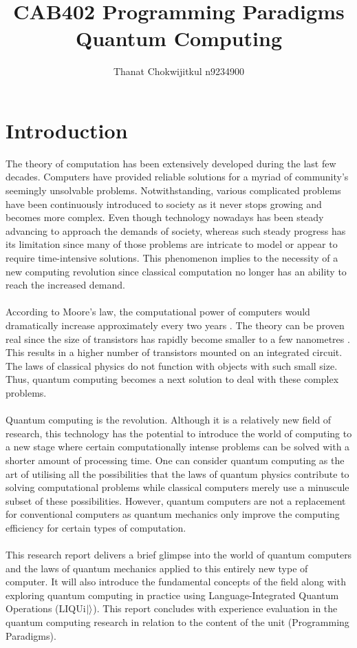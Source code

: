 \documentclass[12pt]{third-rep}
\title{CAB402 Programming Paradigms \\ \vspace{2 mm} {Quantum Computing}}
\author{Thanat Chokwijitkul n9234900}
\date{}
\begin{document}
\maketitle %

\tableofcontents


\chapter{Introduction}

The theory of computation has been extensively developed during the last few decades. Computers have provided reliable solutions for a myriad of community's seemingly unsolvable problems. Notwithstanding, various complicated problems have been continuously introduced to society as it never stops growing and becomes more complex. Even though technology nowadays has been steady advancing to approach the demands of society, whereas such steady progress has its limitation since many of those problems are intricate to model or appear to require time-intensive solutions. This phenomenon implies to the necessity of a new computing revolution since classical computation no longer has an ability to reach the increased demand. \\\\
According to Moore's law, the computational power of computers would dramatically increase approximately every two years \cite{moore}. The theory can be proven real since the size of transistors has rapidly become smaller to a few nanometres \cite{qc-info}. This results in a higher number of transistors mounted on an integrated circuit. The laws of classical physics do not function with objects with such small size. Thus, quantum computing becomes a next solution to deal with these complex problems. \\\\
Quantum computing is the revolution. Although it is a relatively new field of research, this technology has the potential to introduce the world of computing to a new stage where certain computationally intense problems can be solved with a shorter amount of processing time. One can consider quantum computing as the art of utilising all the possibilities that the laws of quantum physics contribute to solving computational problems while classical computers merely use a minuscule subset of these possibilities. However, quantum computers are not a replacement for conventional computers as quantum mechanics only improve the computing efficiency for certain types of computation. \\\\
This research report delivers a brief glimpse into the world of quantum computers and the laws of quantum mechanics applied to this entirely new type of computer. It will also introduce the fundamental concepts of the field along with exploring quantum computing in practice using Language-Integrated Quantum Operations (LIQUi${\left\vert{}\right\rangle}$). This report concludes with experience evaluation in the quantum computing research in relation to the content of the unit (Programming Paradigms).
\end{document}
